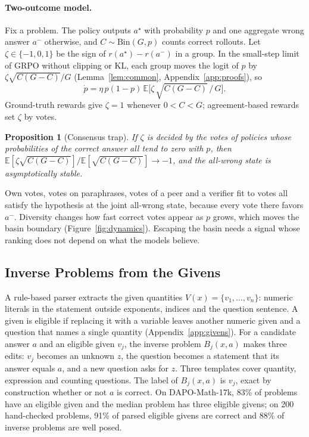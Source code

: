 \documentclass[11pt]{article}
\newtheorem{proposition}{Proposition}
\theoremstyle{remark}
\newcommand{\astar}{a^{\star}}
\newcommand{\aminus}{a^{-}}
\newcommand{\E}{\mathbb{E}}
\begin{document}
\paragraph{Two-outcome model.}
Fix a problem. The policy outputs $\astar$ with probability $p$ and one aggregate wrong answer $\aminus$ otherwise, and $C\sim\mathrm{Bin}(G,p)$ counts correct rollouts. Let $\zeta\in\{-1,0,1\}$ be the sign of $r(\astar)-r(\aminus)$ in a group. In the small-step limit of GRPO without clipping or KL, each group moves the logit of $p$ by $\zeta\sqrt{C(G-C)}/G$ (Lemma~\ref{lem:common}, Appendix~\ref{app:proofs}), so
\begin{equation}
\label{eq:dyn}
\dot p=\eta\,p(1-p)\,\E\big[\zeta\,\sqrt{C(G-C)}\,/\,G\big].
\end{equation}
Ground-truth rewards give $\zeta=1$ whenever $0<C<G$; agreement-based rewards set $\zeta$ by votes.

\begin{proposition}[Consensus trap]
\label{prop:trap}
If $\zeta$ is decided by the votes of policies whose probabilities of the correct answer all tend to zero with $p$, then $\E[\zeta\sqrt{C(G-C)}]/\E[\sqrt{C(G-C)}]\to-1$, and the all-wrong state is asymptotically stable.
\end{proposition}

Own votes, votes on paraphrases, votes of a peer and a verifier fit to votes all satisfy the hypothesis at the joint all-wrong state, because every vote there favors $\aminus$. Diversity changes how fast correct votes appear as $p$ grows, which moves the basin boundary (Figure~\ref{fig:dynamics}). Escaping the basin needs a signal whose ranking does not depend on what the models believe.

\subsection{Inverse Problems from the Givens}
\label{sec:inverse}

A rule-based parser extracts the given quantities $V(x)=\{v_1,\dots,v_n\}$: numeric literals in the statement outside exponents, indices and the question sentence. A given is eligible if replacing it with a variable leaves another numeric given and a question that names a single quantity (Appendix~\ref{app:givens}). For a candidate answer $a$ and an eligible given $v_j$, the inverse problem $B_j(x,a)$ makes three edits: $v_j$ becomes an unknown $z$, the question becomes a statement that its answer equals $a$, and a new question asks for $z$. Three templates cover quantity, expression and counting questions. The label of $B_j(x,a)$ is $v_j$, exact by construction whether or not $a$ is correct. On DAPO-Math-17k, 83\% of problems have an eligible given and the median problem has three eligible givens; on 200 hand-checked problems, 91\% of parsed eligible givens are correct and 88\% of inverse problems are well posed.
\end{document}
